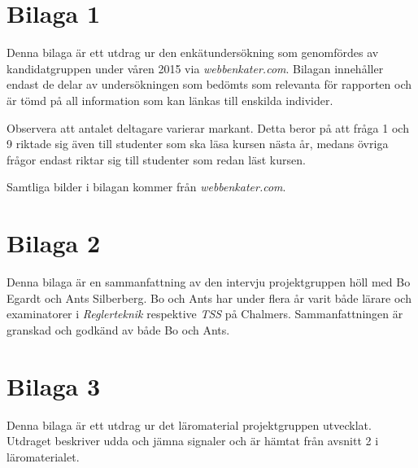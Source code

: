 \documentclass[12pt,a4paper,twoside,openright]{article}
\begin{document}

\section{Bilaga 1}
\label{bil:1}
Denna bilaga är ett utdrag ur den enkätundersökning som genomfördes av
kandidatgruppen under våren 2015 via \textit{webbenkater.com}. Bilagan
innehåller endast de delar av undersökningen som bedömts som relevanta
för rapporten och är tömd på all information som kan länkas till
enskilda individer.

Observera att antalet deltagare varierar markant. Detta beror på att
fråga 1 och 9 riktade sig även till studenter som ska läsa kursen
nästa år, medans övriga frågor endast riktar sig till studenter som
redan läst kursen.

Samtliga bilder i bilagan kommer från
\textit{webbenkater.com}.

\newpage

\section{Bilaga 2}
\label{bil:exam_intervju}
Denna bilaga är en sammanfattning av den intervju projektgruppen höll
med Bo Egardt och Ants Silberberg. Bo och Ants har under flera år
varit både lärare och examinatorer i \textit{Reglerteknik} respektive
\textit{TSS} på Chalmers. Sammanfattningen är granskad och godkänd av
både Bo och Ants.

\newpage

\section{Bilaga 3}
\label{bil:3}
Denna bilaga är ett utdrag ur det läromaterial projektgruppen
utvecklat. Utdraget beskriver udda och jämna signaler och är hämtat
från avsnitt 2 i läromaterialet.

\end{document}
